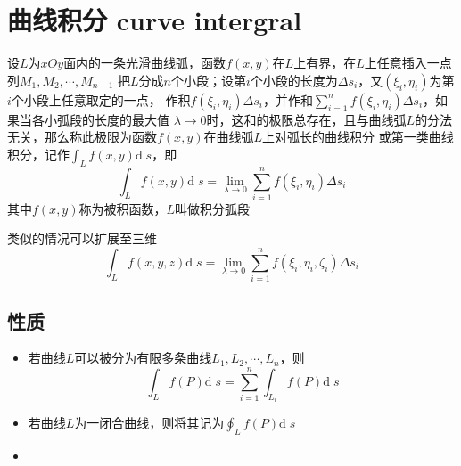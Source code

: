 \documentclass[UTF8]{ctexart}
\newcommand{\dif}[1]{{\text{d}\;\!#1}}
\newcommand{\emplin}{\vspace{1em}}
\begin{document}
\section*{曲线积分 curve intergral}
设$L$为$xOy$面内的一条光滑曲线弧，函数$f(x,y)$在$L$上有界，在$L$上任意插入一点列$M_1,M_2,\cdots,M_{n-1}$
把$L$分成$n$个小段；设第$i$个小段的长度为$\Delta s_i$，又$(\xi_i,\eta_i)$为第$i$个小段上任意取定的一点，
作积$f(\xi_i,\eta_i)\Delta s_i$，并作和$\sum^n_{i=1}f(\xi_i,\eta_i)\Delta s_i$，如果当各小弧段的长度的最大值
$\lambda\to0$时，这和的极限总存在，且与曲线弧$L$的分法无关，那么称此极限为函数$f(x,y)$在曲线弧$L$上对弧长的曲线积分
或第一类曲线积分，记作$\int_Lf(x,y)\dif{s}$，即
\[\int_Lf(x,y)\dif{s}=\lim_{\lambda\to0}\sum^n_{i=1}f(\xi_i,\eta_i)\Delta s_i\]
其中$f(x,y)$称为被积函数，$L$叫做积分弧段

\emplin

类似的情况可以扩展至三维
\[\int_Lf(x,y,z)\dif{s}=\lim_{\lambda\to0}\sum^n_{i=1}f(\xi_i,\eta_i,\zeta_i)\Delta s_i\]

\emplin

\subsection*{性质}
\begin{itemize}
  \item 若曲线$L$可以被分为有限多条曲线$L_1,L_2,\cdots,L_n$，则
  \[ \int_Lf(P)\dif{s}=\sum^n_{i=1}\int_{L_i}f(P)\dif{s} \]
  \item 若曲线$L$为一闭合曲线，则将其记为$\displaystyle \oint_Lf(P)\dif{s}$
  \item 
\end{itemize}
\end{document}

